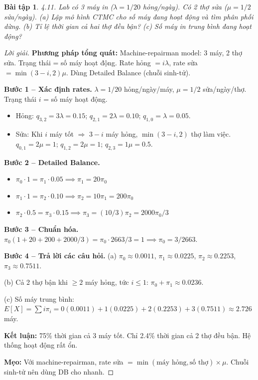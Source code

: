 \documentclass[8pt,a4paper]{article}
\newtheorem{exercise}{Bài tập}
\newenvironment{solution}{\begin{proof}[Lời giải]}{\end{proof}}
\begin{document}
\begin{exercise}
4.11. Lab có 3 máy in ($\lambda = 1/20$ hỏng/ngày). Có 2 thợ sửa ($\mu = 1/2$ sửa/ngày). 
(a) Lập mô hình CTMC cho số máy đang hoạt động và tìm phân phối dừng. 
(b) Tỉ lệ thời gian cả hai thợ đều bận? 
(c) Số máy in trung bình đang hoạt động?
\end{exercise}
\begin{solution}
\textbf{Phương pháp tổng quát:} Machine-repairman model: 3 máy, 2 thợ sửa. Trạng thái = số máy hoạt động. Rate hỏng $= i\lambda$, rate sửa $= \min(3-i, 2)\mu$. Dùng Detailed Balance (chuỗi sinh-tử).

\textbf{Bước 1 -- Xác định rates.} $\lambda = 1/20$ hỏng/ngày/máy, $\mu = 1/2$ sửa/ngày/thợ. Trạng thái $i$ = số máy hoạt động.
\begin{itemize}[nosep]
\item Hỏng: $q_{3,2} = 3\lambda = 0.15$; $q_{2,1} = 2\lambda = 0.10$; $q_{1,0} = \lambda = 0.05$.
\item Sửa: Khi $i$ máy tốt $\Rightarrow$ $3-i$ máy hỏng, $\min(3-i, 2)$ thợ làm việc.
$q_{0,1} = 2\mu = 1$; $q_{1,2} = 2\mu = 1$; $q_{2,3} = 1\mu = 0.5$.
\end{itemize}

\textbf{Bước 2 -- Detailed Balance.}
\begin{itemize}[nosep]
\item $\pi_0 \cdot 1 = \pi_1 \cdot 0.05 \implies \pi_1 = 20\pi_0$
\item $\pi_1 \cdot 1 = \pi_2 \cdot 0.10 \implies \pi_2 = 10\pi_1 = 200\pi_0$
\item $\pi_2 \cdot 0.5 = \pi_3 \cdot 0.15 \implies \pi_3 = (10/3)\pi_2 = 2000\pi_0/3$
\end{itemize}

\textbf{Bước 3 -- Chuẩn hóa.} $\pi_0(1 + 20 + 200 + 2000/3) = \pi_0 \cdot 2663/3 = 1 \implies \pi_0 = 3/2663$.

\textbf{Bước 4 -- Trả lời các câu hỏi.}
(a) $\pi_0 \approx 0.0011$, $\pi_1 \approx 0.0225$, $\pi_2 \approx 0.2253$, $\pi_3 \approx 0.7511$.

(b) Cả 2 thợ bận khi $\ge 2$ máy hỏng, tức $i \le 1$: $\pi_0 + \pi_1 \approx \boxed{0.0236}$.

(c) Số máy trung bình: $E[X] = \sum i\pi_i = 0(0.0011) + 1(0.0225) + 2(0.2253) + 3(0.7511) \approx \boxed{2.726}$ máy.

\textbf{Kết luận:} 75\% thời gian cả 3 máy tốt. Chỉ 2.4\% thời gian cả 2 thợ đều bận. Hệ thống hoạt động rất ổn.

\textbf{Mẹo:} Với machine-repairman, rate sửa $= \min(\text{máy hỏng}, \text{số thợ}) \times \mu$. Chuỗi sinh-tử nên dùng DB cho nhanh.
\end{solution}
\end{document}

